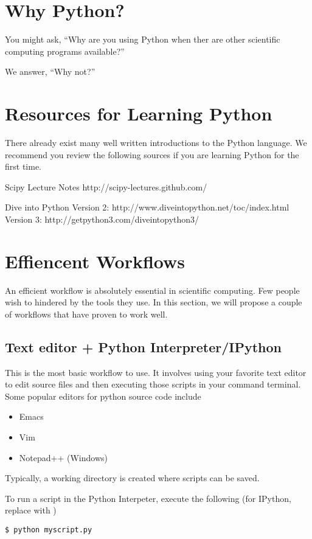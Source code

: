 \section*{Why Python?}
You might ask, ``Why are you using Python when ther are other scientific computing programs available?''  

We answer, ``Why not?''

\section*{Resources for Learning Python}
There already exist many well written introductions to the Python language.  We recommend you review the following sources if you are learning Python for the first time.

Scipy Lecture Notes
http://scipy-lectures.github.com/

Dive into Python
Version 2: http://www.diveintopython.net/toc/index.html
Version 3: http://getpython3.com/diveintopython3/



\section*{Effiencent Workflows}
An efficient workflow is absolutely essential in scientific computing.  Few people wish to hindered by the tools they use.  In this section, we will propose a couple of workflows that have proven to work well.

\subsection*{Text editor + Python Interpreter/IPython}
This is the most basic workflow to use.  It involves using your favorite text editor to edit source files and then executing those scripts in your command terminal.  Some popular editors for python source code include
\begin{itemize}
\item Emacs
\item Vim
\item Notepad++ (Windows)
\end{itemize}

Typically, a working directory is created where scripts can be saved.

To run a script in the Python Interpeter, execute the following (for IPython, replace  with )
\begin{verbatim}
$ python myscript.py
\end{verbatim}

